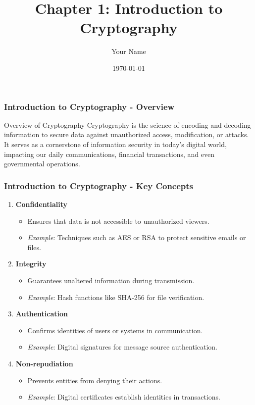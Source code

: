 \documentclass{beamer}
\title{Chapter 1: Introduction to Cryptography}
\author{Your Name}
\institute{Your Institution}
\date{\today}
\begin{document}
\frame{\titlepage}

\begin{frame}[fragile]
    \frametitle{Introduction to Cryptography - Overview}
    \begin{block}{Overview of Cryptography}
        Cryptography is the science of encoding and decoding information to secure data against unauthorized access, modification, or attacks. 
        It serves as a cornerstone of information security in today's digital world, impacting our daily communications, financial transactions, and even governmental operations.
    \end{block}
\end{frame}

\begin{frame}[fragile]
    \frametitle{Introduction to Cryptography - Key Concepts}
    \begin{enumerate}
        \item \textbf{Confidentiality}
            \begin{itemize}
                \item Ensures that data is not accessible to unauthorized viewers.
                \item \textit{Example}: Techniques such as AES or RSA to protect sensitive emails or files.
            \end{itemize}
        \item \textbf{Integrity}
            \begin{itemize}
                \item Guarantees unaltered information during transmission.
                \item \textit{Example}: Hash functions like SHA-256 for file verification.
            \end{itemize}
        \item \textbf{Authentication}
            \begin{itemize}
                \item Confirms identities of users or systems in communication.
                \item \textit{Example}: Digital signatures for message source authentication.
            \end{itemize}
        \item \textbf{Non-repudiation}
            \begin{itemize}
                \item Prevents entities from denying their actions.
                \item \textit{Example}: Digital certificates establish identities in transactions.
            \end{itemize}
    \end{enumerate}
\end{frame}
\end{document}
